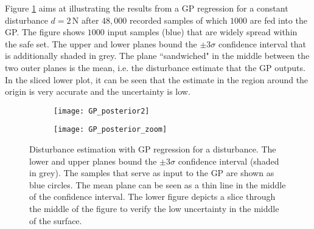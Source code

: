 \documentclass[../main.tex]{subfiles}
\begin{document}
Figure \ref{fig:GP_posterior} aims at illustrating the results from a GP regression for a constant disturbance $d = 2 \, \text{N}$ after $48,000$ recorded samples of which $1000$ are fed into the GP. The figure shows $1000$ input samples (blue) that are widely spread within the safe set. The upper and lower planes bound the $\pm 3\sigma$ confidence interval that is additionally shaded in grey. The plane ``sandwiched" in the middle between the two outer planes is the mean, i.e. the disturbance estimate that the GP outputs. In the sliced lower plot, it can be seen that the estimate in the region around the origin is very accurate and the uncertainty is low.
\begin{figure}
    \centering
    \begin{subfigure}[t]{\textwidth}
        \texttt{[image: GP\_posterior2]}
    \end{subfigure}
    
    \begin{subfigure}[t]{\textwidth}
        \texttt{[image: GP\_posterior\_zoom]}
        \end{subfigure}    \caption{Disturbance estimation with GP regression for a disturbance. The lower and upper planes bound the $\pm 3\sigma$ confidence interval (shaded in grey). The samples that serve as input to the GP are shown as blue circles. The mean plane can be seen as a thin line in the middle of the confidence interval. The lower figure depicts a slice through the middle of the figure to verify the low uncertainty in the middle of the surface.}  \label{fig:GP_posterior}
\end{figure}
\end{document}
